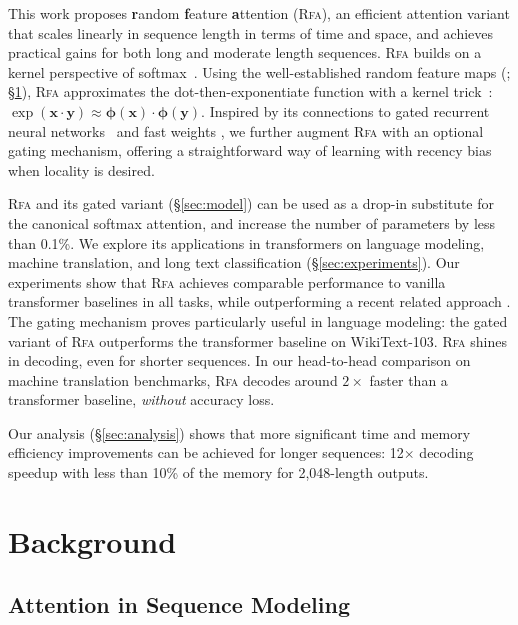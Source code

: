This work proposes \textbf{r}andom \textbf{f}eature
\textbf{a}ttention (\textsc{Rfa}),
{an efficient attention variant} that scales linearly in sequence length in terms of time and space, {and achieves practical gains for both long and moderate length sequences.}
\textsc{Rfa} builds on a kernel perspective of softmax~\citep{rawat2019sampled}. Using the well-established random feature maps (\citealp{rahimi2009rff,avron2016qmc}; \S\ref{sec:background}),
\textsc{Rfa} approximates the dot-then-exponentiate function with a kernel trick~\citep{hofmann2008kernel}: ${\exp({\mathbf{x}}\cdot{\mathbf{y}})
\approx\boldsymbol{\phi}({\mathbf{x}})\cdot\boldsymbol{\phi}({\mathbf{y}})}$.
Inspired by its connections to gated recurrent neural networks~\citep{hochreiter1997lstm,cho2014gru} and  fast weights \citep{schmidhuber1992learning}, we further augment \textsc{Rfa} with an optional gating mechanism, offering a straightforward way of learning with recency bias when locality is desired.

\textsc{Rfa} and its gated variant (\S\ref{sec:model})
can be used as a drop-in substitute for the canonical softmax attention, and increase the number of parameters by less than 0.1\%.
We explore its applications in transformers on language modeling, machine translation, {and long text classification} (\S\ref{sec:experiments}).
Our experiments show that \textsc{Rfa} achieves comparable performance to vanilla transformer baselines in {all} tasks, while outperforming a recent related approach \citep{katharopoulos20transformers}. The gating mechanism proves particularly useful in language modeling: the gated variant of \textsc{Rfa}
outperforms the transformer baseline on WikiText-103.
\textsc{Rfa} shines in decoding, even for shorter sequences. In our head-to-head comparison on machine translation benchmarks, 
\textsc{Rfa} decodes around $2\times$ faster than a transformer baseline,
\emph{without} accuracy loss. 

Our analysis (\S\ref{sec:analysis}) shows that more significant time and memory efficiency improvements can be achieved for longer sequences: 12$\times$ decoding speedup with less than 10\% of the memory for 2,048-length outputs.

\section{Background}\label{sec:background}

\subsection{Attention in Sequence Modeling}\label{sec:attention}

